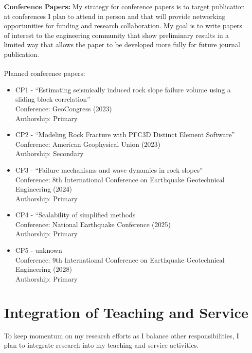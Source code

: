 \documentclass[10pt,letterpaper]{article}
\begin{document}
\noindent \textbf{Conference Papers:} My strategy for conference papers is to target publication at conferences I plan to attend in person and that will provide networking opportunities for funding and research collaboration.
My goal is to write papers of interest to the engineering community that show preliminary results in a limited way that allows the paper to be developed more fully for future journal publication.
\\
\\
\noindent Planned conference papers:
\begin{itemize}
\item CP1 - ``Estimating seismically induced rock slope failure volume using a sliding block correlation''
\\Conference: GeoCongress (2023)
\\ Authorship: Primary
\item CP2 - ``Modeling Rock Fracture with PFC3D Distinct Element Software''
\\Conference: American Geophysical Union (2023)
\\ Authorship: Secondary
\item CP3 - ``Failure mechanisms and wave dynamics in rock slopes''
\\ Conference: 8th International Conference on Earthquake Geotechnical Engineering (2024)
\\ Authorship: Primary
\item CP4 - ``Scalability of simplified methods
\\ Conference: National Earthquake Conference (2025)
\\ Authorship: Primary
\item CP5 - unknown
\\ Conference: 9th International Conference on Earthquake Geotechnical Engineering (2028)
\\ Authorship: Primary
\end{itemize}


\section{Integration of Teaching and Service}
To keep momentum on my research efforts as I balance other responsibilities, I plan to integrate research into my teaching and service activities.
\end{document}
